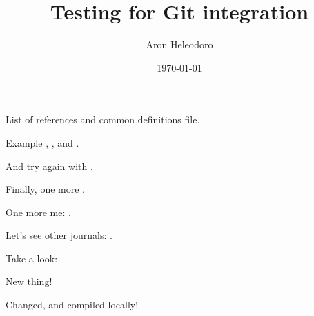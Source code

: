 \documentclass{article}
\title{Testing for Git integration}
\author{Aron Heleodoro}
\date{\today}
\begin{document}
\maketitle

List of references and common definitions file.

Example \cite{benjamin_hennion_higher_2017}, \cite{heleodoro_geometry_2018}, \cite{Raskin-D-modules} and \cite{HA}.

And try again with \cite{heleodoro_geometry_2018}.

Finally, one more \cite{elmanto2020nilpotent}.

One more me: \cite{heleodoro2020prestacks}.

Let's see other journals: \cite{AGH}.

Take a look: \cites{shirane2020double,shirane2020arXiv201009243S}

New thing!

Changed, and compiled locally!

% 
% 

\printbibliography
\end{document}
